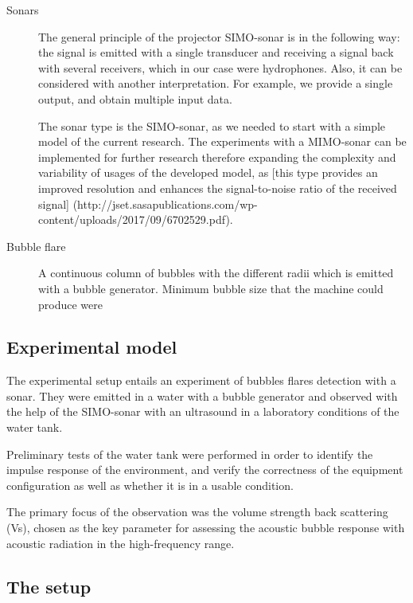 \begin{description}
	\item[Sonars] 

    The general principle of the projector SIMO-sonar is in the following way:  the signal is emitted with a single transducer and receiving a signal back with several receivers, which in our case were hydrophones. Also, it can be considered with another interpretation. For example, we provide a single output, and obtain multiple input data.
    
    The sonar type is the SIMO-sonar, as we needed to start with a simple model of the current research. The experiments with a MIMO-sonar can be implemented for further research therefore expanding the complexity and variability of usages of the developed model, as [this type provides an improved resolution and enhances the signal-to-noise ratio of the received signal] (http://jset.sasapublications.com/wp-content/uploads/2017/09/6702529.pdf).
    
	\item[Bubble flare] 

    A continuous column of bubbles with the different radii which is emitted with a bubble generator. Minimum bubble size that the machine could produce were 
	\item[] 
    
\end{description} 

\subsection{Experimental model}

The experimental setup entails an experiment of bubbles flares detection with a sonar. They were emitted in a water with a bubble generator and observed with the help of the SIMO-sonar with an ultrasound in a laboratory conditions of the water tank. 

Preliminary tests of the water tank were performed in order to identify the impulse response of the  environment, and verify the correctness of the equipment configuration as well as whether it is in a usable condition.

The primary focus of the observation was the volume strength back scattering (Vs), chosen as the key parameter for assessing the acoustic bubble response with acoustic radiation in the high-frequency range. 

\subsection{ The setup}

